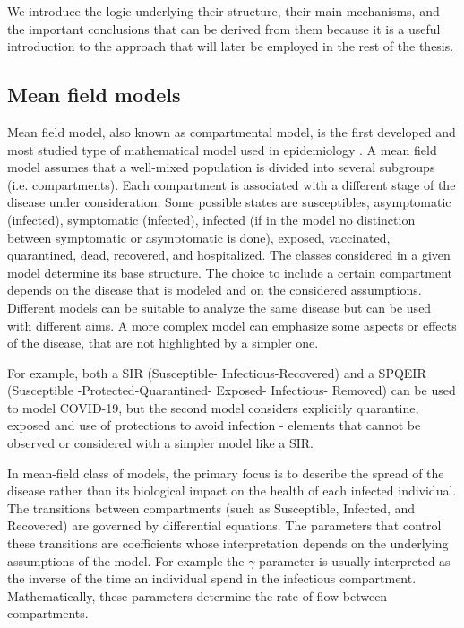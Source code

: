 We introduce the logic underlying their structure, their main mechanisms, and the important conclusions that can be derived from them because it is a useful introduction to the approach that will later be employed in the rest of the thesis.

\subsection{Mean field models}
\label{subsec:mean_field}
 Mean field model, also known as compartmental model, is the first developed and most studied type of mathematical model used in epidemiology \cite{kermack1927, brauer2012mathematical, Anderson_82, anderson1991infectious}. A mean field model assumes that a well-mixed population is divided into several subgroups (i.e. compartments). Each compartment is associated with a different stage of the disease under consideration. Some possible states are susceptibles, asymptomatic (infected), symptomatic (infected), infected (if in the model no distinction between symptomatic or asymptomatic is done), exposed, vaccinated, quarantined, dead, recovered, and hospitalized. The classes considered in a given model determine its base structure. The choice to include a certain compartment depends on the disease that is modeled and on the considered assumptions. Different models can be suitable to analyze the same disease but can be used with different aims. A more complex model can emphasize some aspects or effects of the disease, that are not highlighted by a simpler one.
 
For example, both a SIR (Susceptible- Infectious-Recovered) \cite{Dehning_2020} and a SPQEIR (Susceptible -Protected-Quarantined- Exposed- Infectious- Removed) \cite{Proverbio_2021} can be used to model COVID-19, but the second model considers explicitly quarantine, exposed and use of protections to avoid infection - elements that cannot be observed or considered with a simpler model like a SIR.
  
In mean-field class of models, the primary focus is to describe the spread of the disease rather than its biological impact on the health of each infected individual. The transitions between compartments (such as Susceptible, Infected, and Recovered) are governed by differential equations. The parameters that control these transitions are coefficients whose interpretation depends on the underlying assumptions of the model. For example the $\gamma$ parameter is usually interpreted as the inverse of the time an individual spend in the infectious compartment. Mathematically, these parameters determine the rate of flow between compartments. 

